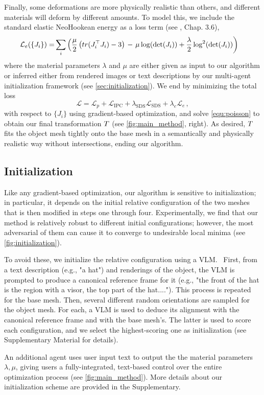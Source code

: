 Finally, some deformations are more physically realistic than others, and different materials will deform by different amounts. To model this, we include the standard elastic NeoHookean energy as a loss term (see \cite{sifakis2012fem}, Chap. 3.6),
\begin{align*}
\mathcal{L}_e (\{J_i\}) = & \sum_i \left(\frac{\mu}{2}\left(tr(J_i^\top J_i) - 3\right)\right.
- \left.\mu \log(\det(J_i))
 + \frac{\lambda}{2} \log^2(\det(J_i)) \right)
\end{align*}
where the material parameters $\lambda$ and $\mu$ are either given as input to our algorithm or inferred either from rendered images or text descriptions by our multi-agent initialization framework (see \autoref{sec:initialization}).
We end by minimizing the total loss
\[
\mathcal{L} = \mathcal{L}_{p} + \mathcal{L}_{\text{IPC}} + \lambda_{\text{SDS}} \mathcal{L}_{\text{SDS}} + \lambda_{e} \mathcal{L}_e\, ,
\]
with respect to $\{J_i\}$ using gradient-based optimization, and solve \autoref{equ:poisson} to obtain our final transformation $T$ (see \autoref{fig:main_method}, right). As desired, $T$ fits the object mesh tightly onto the base mesh in a semantically and physically realistic way without intersections, ending our algorithm.





\subsection{Initialization}
\label{sec:initialization}
Like any gradient-based optimization, our algorithm is sensitive to initialization; in particular, it depends on the initial relative configuration of the two meshes that is then modified in steps one through four.
Experimentally, we find that our method is relatively robust to different initial configurations; however, the most adversarial of them can cause it to converge to undesirable local minima (see \autoref{fig:initialization}).

To avoid these, we initialize the relative configuration using a VLM.  First, from a text description (e.g., "a hat") and renderings of the object, the VLM is prompted to produce a canonical reference frame for it (e.g., "the front of the hat is the region with a visor, the top part of the hat...."). This process is repeated for the base mesh. Then, several different random orientations are sampled for the object mesh. For each, a VLM is used to deduce its alignment with the canonical reference frame and with the base mesh's. The latter is used to score each configuration, and we select the highest-scoring one as initialization (see Supplementary Material for details). 


 An additional agent uses user input text to output the the material parameters $\lambda, \mu$, giving users a fully-integrated, text-based control over the entire optimization process (see \autoref{fig:main_method}).
More details about our initialization scheme are provided in the Supplementary.

